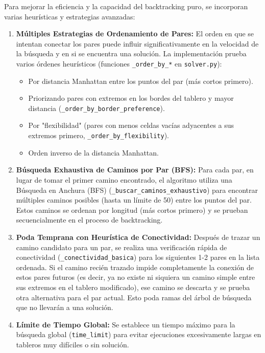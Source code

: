 \documentclass[spanish]{article}
\numberwithin{equation}{section}
\numberwithin{figure}{section}
\theoremstyle{definition}
\begin{document}
Para mejorar la eficiencia y la capacidad del backtracking puro, se incorporan varias heurísticas y estrategias avanzadas:
\begin{enumerate}
    \item \textbf{Múltiples Estrategias de Ordenamiento de Pares:} El orden en que se intentan conectar los pares puede influir significativamente en la velocidad de la búsqueda y en si se encuentra una solución. La implementación prueba varios órdenes heurísticos (funciones \texttt{\_order\_by\_*} en \texttt{solver.py}):
    \begin{itemize}
        \item Por distancia Manhattan entre los puntos del par (más cortos primero).
        \item Priorizando pares con extremos en los bordes del tablero y mayor distancia (\texttt{\_order\_by\_border\_preference}).
        \item Por "flexibilidad" (pares con menos celdas vacías adyacentes a sus extremos primero, \texttt{\_order\_by\_flexibility}).
        \item Orden inverso de la distancia Manhattan.
    \end{itemize}
    \item \textbf{Búsqueda Exhaustiva de Caminos por Par (BFS):} Para cada par, en lugar de tomar el primer camino encontrado, el algoritmo utiliza una Búsqueda en Anchura (BFS) (\texttt{\_buscar\_caminos\_exhaustivo}) para encontrar múltiples caminos posibles (hasta un límite de 50) entre los puntos del par. Estos caminos se ordenan por longitud (más cortos primero) y se prueban secuencialmente en el proceso de backtracking.
    \item \textbf{Poda Temprana con Heurística de Conectividad:} Después de trazar un camino candidato para un par, se realiza una verificación rápida de conectividad (\texttt{\_conectividad\_basica}) para los siguientes 1-2 pares en la lista ordenada. Si el camino recién trazado impide completamente la conexión de estos pares futuros (es decir, ya no existe ni siquiera un camino simple entre sus extremos en el tablero modificado), ese camino se descarta y se prueba otra alternativa para el par actual. Esto poda ramas del árbol de búsqueda que no llevarán a una solución.
    \item \textbf{Límite de Tiempo Global:} Se establece un tiempo máximo para la búsqueda global (\texttt{time\_limit}) para evitar ejecuciones excesivamente largas en tableros muy difíciles o sin solución.
\end{enumerate}
\end{document}
